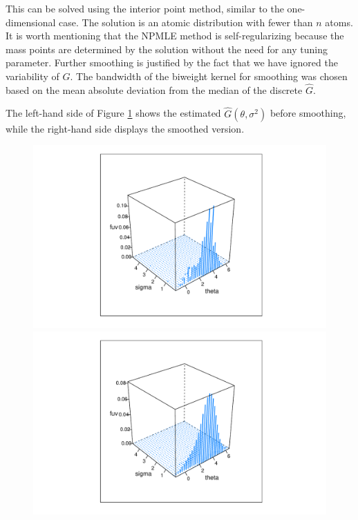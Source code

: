 \documentclass[12pt]{article}
\begin{document}
This can be solved using the interior point method, similar to the
one-dimensional case. The solution is an atomic distribution with fewer than
$n$ atoms. It is worth mentioning that the NPMLE method is self-regularizing
because the mass points are determined by the solution without the need for any
tuning parameter. Further smoothing is justified by the fact that we have
ignored the variability of $G$. The bandwidth of the biweight kernel for
smoothing was chosen based on the mean absolute deviation from the median of
the discrete $\hat{G}$.

The left-hand side of Figure \ref{fig:GLVmix} shows the estimated
$\hat{G}(\theta, \sigma^2)$ before smoothing, while the right-hand side
displays the smoothed version.

\begin{figure}[h!]
    \centering
    \begin{minipage}{0.5\textwidth}
        \centering
        \includegraphics[width=\textwidth]{../../Figures/2013-2022/GMM_fd/GLVmix.pdf}
    \end{minipage}\hfill
    \begin{minipage}{0.5\textwidth}
        \centering
        \includegraphics[width=\textwidth]{../../Figures/2013-2022/GMM_fd/GLVmix_s.pdf}
    \end{minipage}
    \label{fig:GLVmix}
\end{figure}
\end{document}
